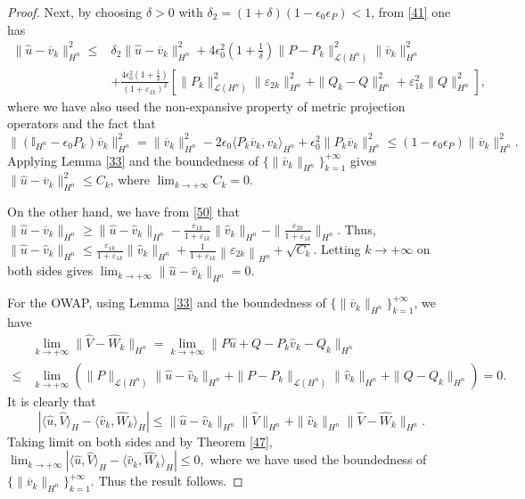 \documentclass[10pt]{article}
\begin{document}
\begin{proof}
Next, by choosing $\delta>0$ with $\delta_2=(1+\delta)(1-\epsilon_0\epsilon_P)<1$, from \eqref{41} one has
\begin{align*}
\|\widehat{u}-\overline{v}_k\|_{H^n}^2
\leq & \delta_2\|\widehat{u}-\overline{v}_k\|_{H^n}^2+4\epsilon^2_0(1+\frac{1}{\delta})\|P-P_k\|_{\mathcal{L}(H^n)}^2\|\overline{v}_k\|_{H^n}^2\\
&+\frac{4\epsilon^2_0(1+\frac{1}{\delta})}{(1+\varepsilon_{1k})^2}[\|P_k\|_{\mathcal{L}(H^n)}^2\|\varepsilon_{2k}\|_{H^n}^2+\|Q_k-Q\|_{H^n}^2+\varepsilon^2_{1k}\|Q\|_{H^n}^2],
\end{align*}
where we have also used the non-expansive property of metric projection operators and the fact that 
$\|(\mathbb{I}_{H^n}-\epsilon_0P_k)\overline{v}_k\|_{H^n}^2
=\|\overline{v}_k\|_{H^n}^2-2\epsilon_0\langle P_k\overline{v}_k,\overline{v}_k\rangle_{H^n}+
\epsilon_0^2\|P_k\overline{v}_k\|_{H^n}^2
\leq (1-\epsilon_0\epsilon_P)\|\overline{v}_k\|_{H^n}^2.
$
 Applying Lemma \ref{33} and the boundedness of $\{\|\overline{v}_k\|_{H^n}\}_{k=1}^{+\infty}$ gives
$\|\widehat{u}-\overline{v}_k\|_{H^n}^2\leq C_k$,
 where $\lim_{k\rightarrow+\infty}C_k=0$.

On the other hand, we have from \eqref{50} that
$
\|\widehat{u}-\overline{v}_k\|_{H^n}
\geq\|\widehat{u}-\widehat{v}_k\|_{H^n}-\frac{\varepsilon_{1k}}{1+\varepsilon_{1k}}\|\widehat{v}_k\|_{H^n}
-\|\frac{\varepsilon_{2k}}{1+\varepsilon_{1k}}\|_{H^n}.
$
Thus, $\|\widehat{u}-\widehat{v}_k\|_{H^n}\leq\frac{\varepsilon_{1k}}{1+\varepsilon_{1k}}\|\widehat{v}_k\|_{H^n}
+\frac{1}{1+\varepsilon_{1k}}\left\|\varepsilon_{2k}\right\|_{H^n}+\sqrt{C_k}.$
Letting $k\rightarrow+\infty$ on both sides gives $\lim_{k\rightarrow+\infty}\|\widehat{u}-\widehat{v}_k\|_{H^n}=0$.

For the OWAP, using Lemma \ref{33} and the boundedness of $\{\|\overline{v}_k\|_{H^n}\}_{k=1}^{+\infty}$, we have
\begin{align}\label{42}
&\lim_{k\rightarrow+\infty}\|\widehat{V}-\widehat{W}_k\|_{H^n}
= \lim_{k\rightarrow+\infty}\|P\widehat{u}+Q-P_k\widehat{v}_k-Q_k\|_{H^n}\\   
   \leq&\lim_{k\rightarrow+\infty}(\|P\|_{\mathcal{L}(H^n)}\|\widehat{u}-\widehat{v}_k\|_{H^n}+\|P-P_k\|_{\mathcal{L}(H^n)}\|\widehat{v}_k\|_{H^n}
   +\|Q-Q_k\|_{H^n})=0.\nonumber
\end{align}
It is clearly that
$$
|\langle \widehat{u},\widehat{V}\rangle_H-\langle \widehat{v}_k,\widehat{W}_k\rangle_H|
\leq\|\widehat{u}-\widehat{v}_k\|_{H^n}\|\widehat{V}\|_{H^n}+\|\widehat{v}_k\|_{H^n}\|\widehat{V}-\widehat{W}_k\|_{H^n}.
$$
Taking limit on both sides and by Theorem \ref{47}, $\lim_{k\rightarrow+\infty}|\langle \widehat{u},\widehat{V}\rangle_H-\langle \widehat{v}_k,\widehat{W}_k\rangle_H|\leq 0,$
where we have used the  boundedness of $\{\|\overline{v}_k\|_{H^n}\}_{k=1}^{+\infty}$. Thus the result follows.
\end{proof}
\end{document}
